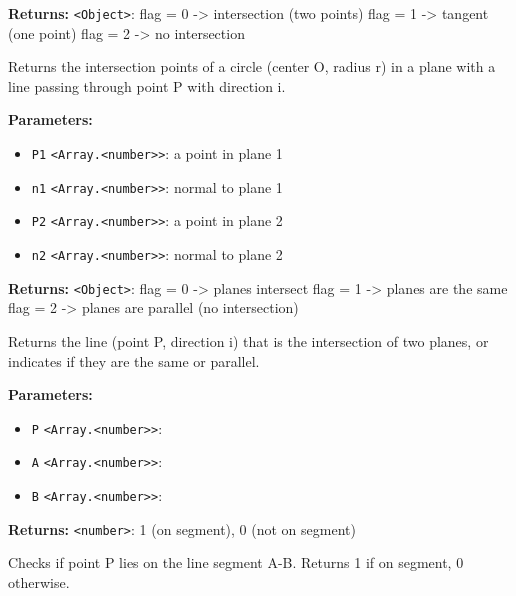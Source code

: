\documentclass[12pt,a4paper]{article}
\begin{document}
\noindent \textbf{Returns:} \texttt{<Object>}: flag = 0 -> intersection (two points)
  flag = 1 -> tangent (one point)
  flag = 2 -> no intersection

\noindent Returns the intersection points of a circle (center O, radius r) 
in a plane with a line passing through point P with direction i.

\vspace{5mm}
\noindent {}


\noindent \textbf{Parameters:}
\begin{itemize}
  \item \texttt{P1} \texttt{<Array.<number>>}: a point in plane 1
  \item \texttt{n1} \texttt{<Array.<number>>}: normal to plane 1
  \item \texttt{P2} \texttt{<Array.<number>>}: a point in plane 2
  \item \texttt{n2} \texttt{<Array.<number>>}: normal to plane 2
\end{itemize}

\noindent \textbf{Returns:} \texttt{<Object>}: flag = 0 -> planes intersect
  flag = 1 -> planes are the same
  flag = 2 -> planes are parallel (no intersection)

\noindent Returns the line (point P, direction i) that is the intersection 
of two planes, or indicates if they are the same or parallel.

\vspace{5mm}
\noindent {}


\noindent \textbf{Parameters:}
\begin{itemize}
  \item \texttt{P} \texttt{<Array.<number>>}: 
  \item \texttt{A} \texttt{<Array.<number>>}: 
  \item \texttt{B} \texttt{<Array.<number>>}: 
\end{itemize}

\noindent \textbf{Returns:} \texttt{<number>}: 1 (on segment), 0 (not on segment)

\noindent Checks if point P lies on the line segment A-B.
Returns 1 if on segment, 0 otherwise.
\end{document}
